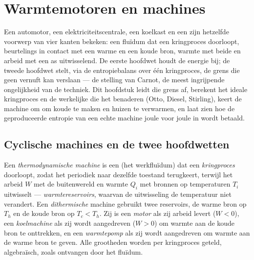 \chapter{Warmtemotoren en machines}\label{ch:b1:heat-engines}

Een automotor, een elektriciteitscentrale, een koelkast en een  zijn
hetzelfde voorwerp van vier kanten bekeken: een fluïdum dat een kringproces
doorloopt, beurtelings in contact met een warme en een koude bron, warmte met
beide en arbeid met een as uitwisselend. De eerste hoofdwet houdt de energie bij; de
tweede hoofdwet stelt, via de entropiebalans over één kringproces, de grens
die geen vernuft kan verslaan --- de stelling van Carnot, de meest ingrijpende
ongelijkheid van de techniek. Dit hoofdstuk leidt die grens af, berekent
het ideale kringproces en de werkelijke die het benaderen (Otto, Diesel,
Stirling), keert de machine om om koude te maken en huizen te verwarmen,
en laat zien hoe de geproduceerde entropie van een echte machine joule voor
joule in  wordt betaald.

\section{Cyclische machines en de twee hoofdwetten}

\begin{definition}\label{def:b1:heat-engines:machine}
Een \emph{thermodynamische machine} is een  (het werkfluïdum)
dat een \emph{kringproces} doorloopt, zodat het periodiek naar dezelfde
toestand terugkeert, terwijl het arbeid $W$ met de buitenwereld en warmte $Q_i$ met
bronnen op temperaturen $T_i$ uitwisselt --- \emph{warmtereservoirs}, waarvan de
uitwisseling de temperatuur niet verandert. Een \emph{dithermische} machine gebruikt twee
reservoirs, de warme bron op $T_h$ en de koude bron op $T_c < T_h$.
Zij is een \emph{motor} als zij arbeid levert ($W < 0$), een
\emph{koelmachine} als zij wordt aangedreven ($W > 0$) om warmte aan de koude
bron te onttrekken, en een \emph{warmtepomp} als zij wordt aangedreven om warmte aan de warme bron te geven.
Alle grootheden worden per kringproces geteld, algebraïsch, zoals ontvangen
door het fluïdum.
\end{definition}

